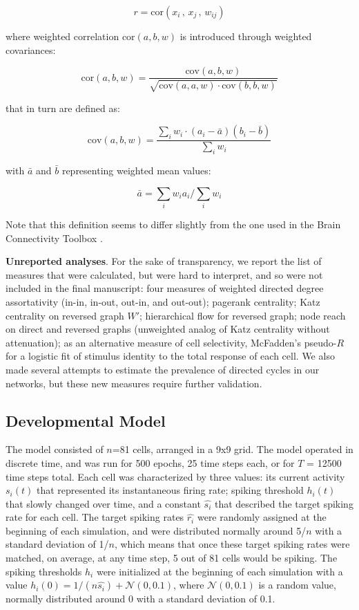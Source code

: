 \documentclass{article}
\begin{document}
\[ r=\text{cor}(x_i \, , \, x_j \, , \, w_{ij}) \]

where weighted correlation $\text{cor}(a,b,w)$ is introduced through weighted covariances: 

\[ \text{cor}(a,b,w) = \frac{\text{cov}(a,b,w)}{\sqrt{\text{cov}(a,a,w) \cdot \text{cov}(b,b,w)}} \]

that in turn are defined as: 

\[ \text{cov}(a,b,w) = \frac{\sum_i{w_i \cdot (a_i-\bar{a})(b_i-\bar{b})}}{\sum_i{w_i}} \]

with $\bar{a}$ and $\bar{b}$ representing weighted mean values: 

\[ \bar{a}=\sum_i{w_i a_i}/\sum_i{w_i} \]

Note that this definition seems to differ slightly from the one used in the Brain Connectivity Toolbox \citep{rubinov2010toolbox}.

\textbf{Unreported analyses}. For the sake of transparency, we report the list of measures that were calculated, but were hard to interpret, and so were not included in the final manuscript: four measures of weighted directed degree assortativity (in-in, in-out, out-in, and out-out); pagerank centrality; Katz centrality on reversed graph $W'$; hierarchical flow for reversed graph; node reach on direct and reversed graphs (unweighted analog of Katz centrality without attenuation); as an alternative measure of cell selectivity, McFadden’s pseudo-$R$ for a logistic fit of stimulus identity to the total response of each cell. We also made several attempts to estimate the prevalence of directed cycles in our networks, but these new measures require further validation.

\subsection*{Developmental Model}

The model consisted of $n$=81 cells, arranged in a 9x9 grid. The model operated in discrete time, and was run for 500 epochs, 25 time steps each, or for $T$ = 12500 time steps total. Each cell was characterized by three values: its current activity $s_i(t)$ that represented its instantaneous firing rate; spiking threshold $h_i(t)$ that slowly changed over time, and a constant $\hat{s_i}$ that described the target spiking rate for each cell. The target spiking rates $\hat{r_i}$ were randomly assigned at the beginning of each simulation, and were distributed normally around 5/$n$ with a standard deviation of 1/$n$, which means that once these target spiking rates were matched, on average, at any time step, 5 out of 81 cells would be spiking. The spiking thresholds $h_i$ were initialized at the beginning of each simulation with a value $h_i(0) = 1/(n \hat{s_i}) + \mathcal{N}(0,0.1)$, where $\mathcal{N}(0,0.1)$ is a random value, normally distributed around 0 with a standard deviation of 0.1.
\end{document}
